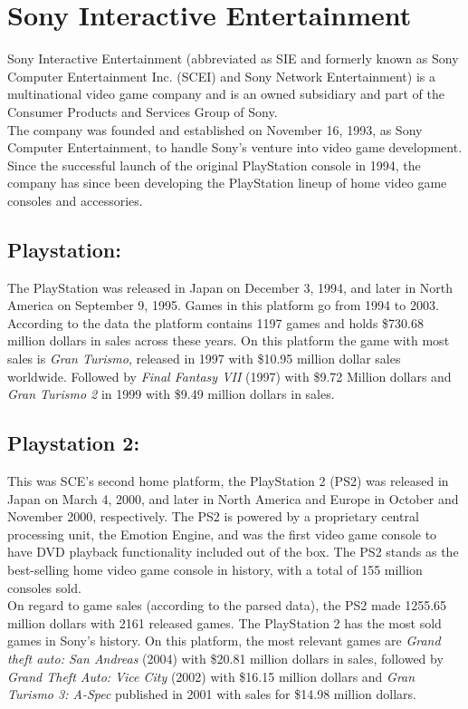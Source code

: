 \section{Sony Interactive Entertainment}
Sony Interactive Entertainment (abbreviated as SIE and formerly known as Sony
Computer Entertainment Inc. (SCEI) and Sony Network Entertainment) is a
multinational video game company and is an owned subsidiary and part of the
Consumer Products and Services Group of Sony.\\

The company was founded and established on November 16, 1993, as Sony
Computer Entertainment, to handle Sony's venture into video game
development. Since the successful launch of the original PlayStation console
in 1994, the company has since been developing the PlayStation lineup of home
video game consoles and accessories\cite{Sony}.\\

\subsection{Playstation:} The PlayStation was released in Japan on December
3, 1994, and later in North America on September 9, 1995\cite{Sony}. Games in
this platform go from 1994 to 2003. According to the data the platform
contains 1197 games and holds \$730.68 million dollars in sales across these
years. On this platform the game with most sales is \textit{Gran Turismo},
released in 1997 with \$10.95 million dollar sales worldwide. Followed by
\textit{Final Fantasy VII} (1997) with \$9.72 Million dollars and
\textit{Gran Turismo 2} in 1999 with \$9.49 million dollars in sales.\\
\subsection{Playstation 2:} This was SCE's second home platform, the PlayStation 2
(PS2) was released in Japan on March 4, 2000, and later in North America and
Europe in October and November 2000, respectively. The PS2 is powered by a
proprietary central processing unit, the Emotion Engine, and was the first
video game console to have DVD playback functionality included out of the
box. The PS2 stands as the best-selling home video game console in history,
with a total of 155 million consoles sold\cite{Sony}.\\
On regard to game sales (according to the parsed data), the PS2 made 1255.65
million dollars with 2161 released games. The PlayStation 2 has the most sold
games in Sony's history. On this platform, the most relevant games are
\textit{Grand theft auto: San Andreas} (2004) with \$20.81 million dollars in
sales, followed by \textit{Grand Theft Auto: Vice City} (2002) with \$16.15
million dollars and \textit{Gran Turismo 3: A-Spec} published in 2001 with
sales for \$14.98 million dollars.\\
